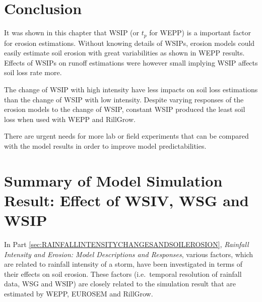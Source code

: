 \section{Conclusion}
\label{sec:ImpactsOfRainfallIntensityChangesOnRunoffAndErosionConclusion}
It was shown in this chapter that WSIP (or $t_p$ for WEPP) is a important factor
for erosion estimations. Without knowing details of WSIPs, erosion models could
easily estimate soil erosion with great variabilities as shown in WEPP results.
Effects of WSIPs on runoff estimations were however small implying WSIP
affects soil loss rate more.

The change of WSIP with high intensity have less impacts on soil loss
estimations than the change of WSIP with low intensity. Despite varying
responses of the erosion models to the change of WSIP, constant WSIP produced
the least soil loss when used with WEPP and RillGrow.

There are urgent needs for more lab or field experiments that can be compared
with the model results in order to improve model predictabilities.


\section{Summary of Model Simulation Result: Effect of WSIV, WSG and WSIP}
\label{sec:SummaryOftheSimulationResults}


In Part \ref{sec:RAINFALLINTENSITYCHANGESANDSOILEROSION}, \textit{Rainfall
Intensity and Erosion: Model Descriptions and Responses}, various factors, which
are related to rainfall intensity of a storm, have been investigated in
terms of their effects on soil erosion. These factors (i.e.\ temporal
resolution of rainfall data, WSG and WSIP) are closely related to the
simulation result that are estimated by WEPP, EUROSEM and RillGrow.

